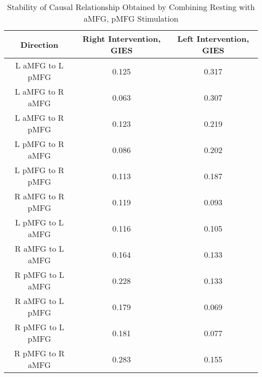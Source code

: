 \documentclass[a4paper,10pt]{article}
\begin{document}
\begin{table}
\centering
\begin{tabular}{|c|c|c|}
\hline
Direction & Right Intervention, GIES & Left Intervention, GIES \\
\hline
L aMFG to L pMFG & 0.125 & 0.317 \\
\hline
L aMFG to R aMFG & 0.063 & 0.307 \\
\hline
L aMFG to R pMFG & 0.123 & 0.219 \\
\hline
L pMFG to R aMFG & 0.086 & 0.202 \\
\hline
L pMFG to R pMFG & 0.113 & 0.187 \\
\hline
R aMFG to R pMFG & 0.119 & 0.093 \\
\hline
L pMFG to L aMFG & 0.116 & 0.105 \\
\hline
R aMFG to L aMFG & 0.164 & 0.133 \\
\hline
R pMFG to L aMFG & 0.228 & 0.133 \\
\hline
R aMFG to L pMFG & 0.179 & 0.069 \\
\hline
R pMFG to L pMFG & 0.181 & 0.077 \\
\hline
R pMFG to R aMFG & 0.283 & 0.155 \\
\hline
\end{tabular}
\caption{Stability of Causal Relationship Obtained by Combining Resting with aMFG, pMFG Stimulation}
\label{table:GIES}
\end{table}
\end{document}
